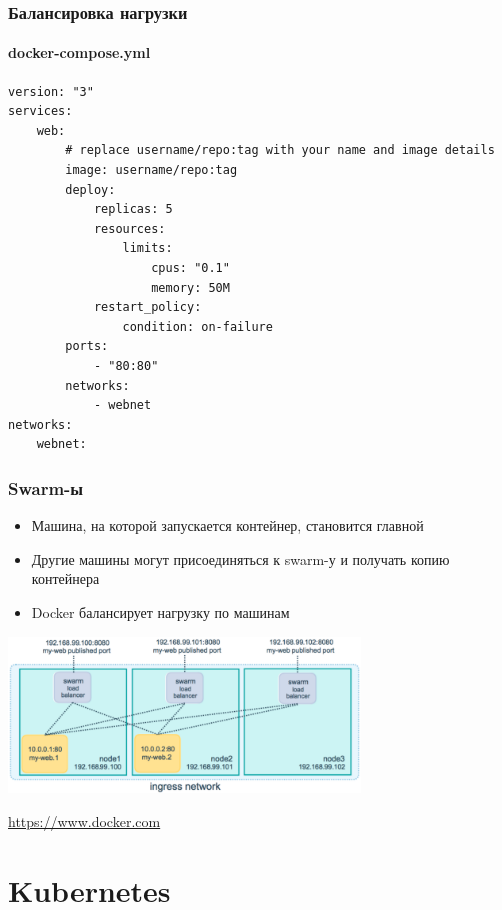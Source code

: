 \documentclass[xetex,mathserif,serif]{beamer}
\newcommand{\attribution}[1] {
    \begin{flushright}\begin{scriptsize}\textcolor{gray}{\textcopyright\; #1}\end{scriptsize}\end{flushright}
}
\begin{document}
    \begin{frame}[fragile]
        \frametitle{Балансировка нагрузки}
        \framesubtitle{docker-compose.yml}
        \begin{scriptsize}
            \begin{verbatim}
version: "3"
services:
    web:
        # replace username/repo:tag with your name and image details
        image: username/repo:tag
        deploy:
            replicas: 5
            resources:
                limits:
                    cpus: "0.1"
                    memory: 50M
            restart_policy:
                condition: on-failure
        ports:
            - "80:80"
        networks:
            - webnet
networks:
    webnet:
            \end{verbatim}
        \end{scriptsize}
    \end{frame}

    \begin{frame}
        \frametitle{Swarm-ы}
        \begin{itemize}
            \item Машина, на которой запускается контейнер, становится главной
            \item Другие машины могут присоединяться к swarm-у и получать копию контейнера
            \item Docker балансирует нагрузку по машинам
        \end{itemize}
        \begin{center}
            \includegraphics[width=0.7\textwidth]{swarmLoadBalancing.png}
            \attribution{\url{https://www.docker.com}}
        \end{center}
    \end{frame}

    \section{Kubernetes}
\end{document}
